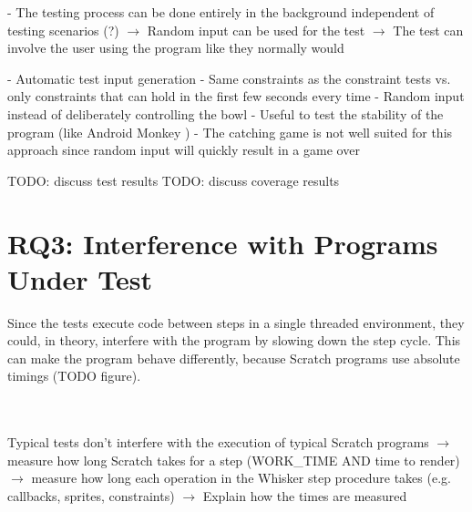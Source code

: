 - The testing process can be done entirely in the background independent of testing scenarios (?)
    $\rightarrow$ Random input can be used for the test
    $\rightarrow$ The test can involve the user using the program like they normally would


- Automatic test input generation
- Same constraints as the constraint tests vs. only constraints that can hold in the first few seconds every time
    - Random input instead of deliberately controlling the bowl
    - Useful to test the stability of the program (like Android Monkey \cite{androidmonkey})
    - The catching game is not well suited for this approach since random input will quickly result in a game over

TODO: discuss test results
TODO: discuss coverage results

\section{RQ3: Interference with Programs Under Test}

Since the tests execute code between steps in a single threaded environment,
they could, in theory, interfere with the program by slowing down the step cycle.
This can make the program behave differently, because Scratch programs use absolute timings (TODO figure).

~\\~\\
Typical tests don't interfere with the execution of typical Scratch programs
$\rightarrow$ measure how long Scratch takes for a step (WORK\_TIME AND time to render)
$\rightarrow$ measure how long each operation in the Whisker step procedure takes (e.g. callbacks, sprites, constraints)
$\rightarrow$ Explain how the times are measured

